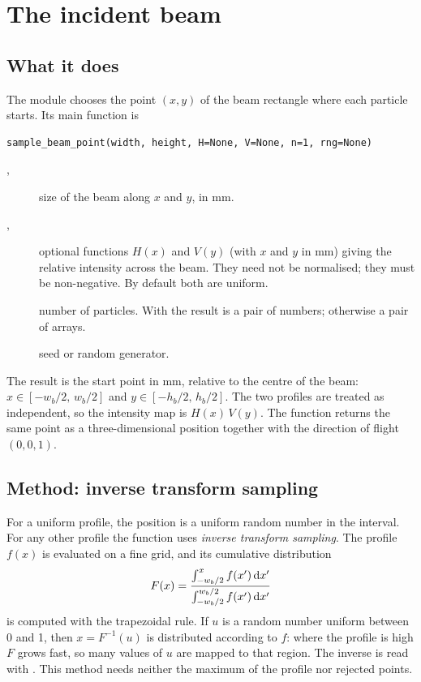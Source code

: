 \chapter{The incident beam}
\label{ch:beam}

\section{What it does}

The module  chooses the point $(x,y)$ of the beam rectangle where each particle starts. Its main
function is
\begin{lstlisting}
sample_beam_point(width, height, H=None, V=None, n=1, rng=None)
\end{lstlisting}
\begin{description}
  \item[, ] size of the beam along $x$ and $y$, in mm.
  \item[, ] optional functions $H(x)$ and $V(y)$ (with $x$ and $y$ in mm) giving the relative intensity
        across the beam. They need not be normalised; they must be non-negative. By default both are uniform.
  \item[] number of particles. With  the result is a pair of numbers; otherwise a pair of arrays.
  \item[] seed or random generator.
\end{description}
The result is the start point in mm, relative to the centre of the beam: $x\in[-w_b/2,\,w_b/2]$ and
$y\in[-h_b/2,\,h_b/2]$. The two profiles are treated as independent, so the intensity map is $H(x)\,V(y)$.
The function  returns the same point as a three-dimensional position together with the direction
of flight $(0,0,1)$.

\section{Method: inverse transform sampling}

For a uniform profile, the position is a uniform random number in the interval. For any other profile the
function uses \emph{inverse transform sampling}. The profile $f(x)$ is evaluated on a fine grid, and its cumulative
distribution
\begin{equation}
  F(x) = \frac{\int_{-w_b/2}^{x} f(x')\,\mathrm{d}x'}{\int_{-w_b/2}^{w_b/2} f(x')\,\mathrm{d}x'}
\end{equation}
is computed with the trapezoidal rule. If $u$ is a random number uniform between 0 and 1, then $x=F^{-1}(u)$ is distributed
according to $f$: where the profile is high $F$ grows fast, so many values of $u$ are mapped to that region. The inverse is
read with . This method needs neither the maximum of the profile nor rejected points.

